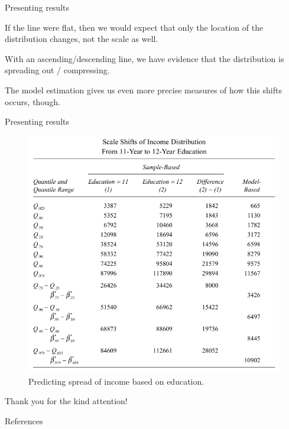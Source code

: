 \documentclass[12pt,english,pdf,xcolor=dvipsnames,aspectratio=169,handout]{beamer}\usepackage[]{graphicx}\usepackage[]{xcolor}
\begin{document}
\begin{frame}{Presenting results}

If the line were flat, then we would expect that only the location of the distribution changes, not the scale as well.\bigskip

With an ascending/descending line, we have evidence that the distribution is spreading out / compressing.\bigskip

The model estimation gives us even more precise measures of how this shifts occurs, though.

\end{frame}


\begin{frame}{Presenting results}

\begin{figure}
\centering
\includegraphics[scale=0.40]{../04-graphs/05-10}
\caption{Predicting spread of income based on education.}
\end{figure}

\end{frame}



\begin{frame}
\begin{center}
    \Huge Thank \textcolor{title}{you} for the kind attention!
\end{center}
\end{frame}


\begin{frame}[allowframebreaks]{References}


\end{frame}
\end{document}
